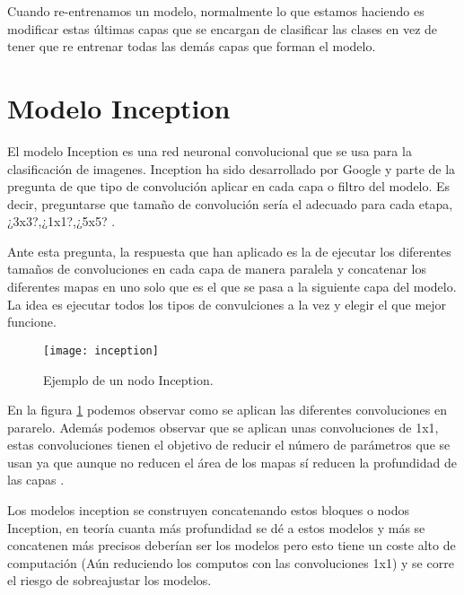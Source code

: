 Cuando re-entrenamos un modelo, normalmente lo que estamos haciendo es modificar estas últimas capas que se encargan de clasificar las clases en vez de tener que re entrenar todas las demás capas que forman el modelo.

\section{Modelo Inception}

El modelo Inception es una red neuronal convolucional que se usa para la clasificación de imagenes. Inception ha sido desarrollado por Google y parte de la pregunta de que tipo de convolución aplicar en cada capa o  filtro del modelo. Es decir, preguntarse que tamaño de convolución sería el adecuado para cada etapa, ¿3x3?,¿1x1?,¿5x5? \cite{depthwiseSeparableConvolutions}.

Ante esta pregunta, la respuesta que han aplicado es la de ejecutar los diferentes tamaños de convoluciones en cada capa de manera paralela y concatenar los diferentes mapas en uno solo que es el que se pasa a la siguiente capa del modelo. La idea es ejecutar todos los tipos de convulciones a la vez y elegir el que mejor funcione.

\begin{figure}[h]
    \begin{center}%
        \begin{center}%
          \texttt{[image: inception]}%
          \caption{Ejemplo de un nodo Inception.}%
          \label{figinception}%
        \end{center}%
  	\end{center}%
\end{figure}%

En la figura \ref{figinception} podemos observar como se aplican las diferentes convoluciones en pararelo. Además podemos observar que se aplican unas convoluciones de 1x1, estas convoluciones tienen el objetivo de reducir el número de parámetros que se usan ya que aunque no reducen el área de los mapas sí reducen la profundidad de las capas \cite{inception}.

Los modelos inception se construyen concatenando estos bloques o nodos Inception, en teoría cuanta más profundidad se dé a estos modelos y más se concatenen más precisos deberían ser los modelos pero esto tiene un coste alto de computación (Aún reduciendo los computos con las convoluciones 1x1) y se corre el riesgo de sobreajustar los modelos.

